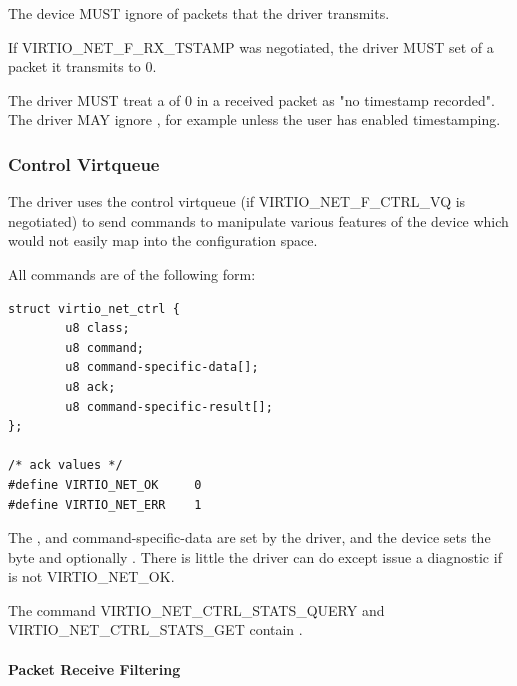 The device MUST ignore  of packets that the driver transmits.


If VIRTIO_NET_F_RX_TSTAMP was negotiated, the driver MUST set 
of a packet it transmits to 0.

The driver MUST treat a  of 0 in a received packet as
"no timestamp recorded". The driver MAY ignore , for example
unless the user has enabled timestamping.

\subsubsection{Control Virtqueue}\label{sec:Device Types / Network Device / Device Operation / Control Virtqueue}

The driver uses the control virtqueue (if VIRTIO_NET_F_CTRL_VQ is
negotiated) to send commands to manipulate various features of
the device which would not easily map into the configuration
space.

All commands are of the following form:

\begin{lstlisting}
struct virtio_net_ctrl {
        u8 class;
        u8 command;
        u8 command-specific-data[];
        u8 ack;
        u8 command-specific-result[];
};

/* ack values */
#define VIRTIO_NET_OK     0
#define VIRTIO_NET_ERR    1
\end{lstlisting}

The ,  and command-specific-data are set by the
driver, and the device sets the  byte and optionally
. There is little the driver can
do except issue a diagnostic if  is not VIRTIO_NET_OK.

The command VIRTIO_NET_CTRL_STATS_QUERY and VIRTIO_NET_CTRL_STATS_GET contain
.

\paragraph{Packet Receive Filtering}\label{sec:Device Types / Network Device / Device Operation / Control Virtqueue / Packet Receive Filtering}
\label{sec:Device Types / Network Device / Device Operation / Control Virtqueue / Setting Promiscuous Mode}%

